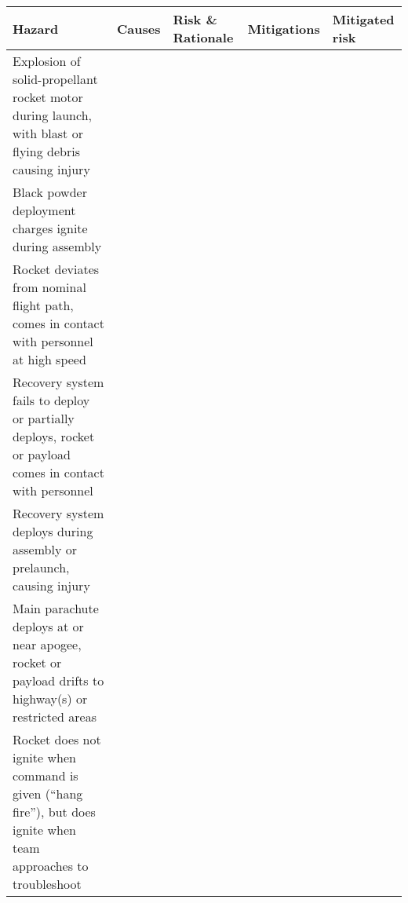 \begingroup

\hspace{-2em}
\small
\begin{longtable}{@{}|p{1.75in}|p{2in}|p{1.75in}|p{2in}|p{0.75in}|@{}}
	\hline Hazard & Causes & Risk \& Rationale & Mitigations & Mitigated risk \\

	\hline Explosion of solid-propellant rocket motor during launch, with blast or flying debris causing injury & & & & \\

	\hline Black powder deployment charges ignite during assembly & & & & \\

	\hline Rocket deviates from nominal flight path, comes in contact with personnel at high speed & & & & \\

	\hline Recovery system fails to deploy or partially deploys, rocket or payload comes in contact with personnel & & & & \\

	\hline Recovery system deploys during assembly or prelaunch, causing injury & & & & \\

	\hline Main parachute deploys at or near apogee, rocket or payload drifts to highway(s) or restricted areas & & & & \\
 
	\hline Rocket does not ignite when command is given (“hang fire”), but does ignite when team approaches to troubleshoot & & & & \\

	\hline 

\end{longtable}
\endgroup


